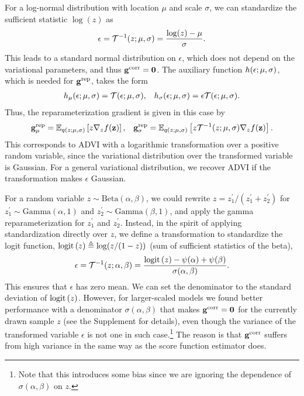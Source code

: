 For a log-normal distribution with location $\mu$ and scale $\sigma$, we can standardize the sufficient statistic $\log(z)$ as
\begin{equation}
	\epsilon=\mathcal{T}^{-1}(z;\mu,\sigma)=\frac{\log(z)-\mu}{\sigma}.\nonumber
\end{equation}
This leads to a standard normal distribution on $\epsilon$, which does not depend on the variational parameters, and thus $\mathbf{g}^{\textrm{corr}}=\mathbf{0}$. The auxiliary function $h(\epsilon;\mu,\sigma)$, which is needed for $\mathbf{g}^{\textrm{rep}}$, takes the form
\begin{align}
    & h_{\mu}(\epsilon;\mu,\sigma) = \mathcal{T}(\epsilon;\mu,\sigma),
    & h_{\sigma}(\epsilon;\mu,\sigma) = \epsilon\mathcal{T}(\epsilon;\mu,\sigma). \nonumber
\end{align}
Thus, the reparameterization gradient is given in this case by
\begin{align}
    & \mathbf{g}^{\textrm{rep}}_{\mu} = \mathbb{E}_{q(z;\mu,\sigma)}\left[z\nabla_{z}f(\mathbf{z})\right],
    & \mathbf{g}^{\textrm{rep}}_{\sigma} = \mathbb{E}_{q(z;\mu,\sigma)}\left[z\mathcal{T}^{-1}(z;\mu,\sigma)\nabla_{z}f(\mathbf{z})\right]. \nonumber
\end{align}
This corresponds to \gls{ADVI} \citep{Kucukelbir2016} with a logarithmic transformation over a positive random variable, since the variational distribution over the transformed variable is Gaussian. For a general variational distribution, we recover \gls{ADVI} if the transformation makes $\epsilon$ Gaussian.

For a random variable $z\sim\textrm{Beta}(\alpha,\beta)$, we could rewrite $z=z_1^\prime/(z_1^\prime+z_2^\prime)$ for $z_1^\prime\sim\textrm{Gamma}(\alpha,1)$ and $z_2^\prime\sim\textrm{Gamma}(\beta,1)$, and apply the gamma reparameterization for $z_1^\prime$ and $z_2^\prime$. Instead, in the spirit of applying standardization directly over $z$, we define a transformation to standardize the logit function, $\textrm{logit}\left(z\right)\triangleq\log(z/(1-z))$ (sum of sufficient statistics of the beta),
\begin{equation}\nonumber
	\epsilon=\mathcal{T}^{-1}(z;\alpha,\beta)=\frac{\textrm{logit}\left(z\right)-\psi(\alpha)+\psi(\beta)}{\sigma(\alpha,\beta)}.
\end{equation}
This ensures that $\epsilon$ has zero mean. We can set the denominator to the standard deviation of $\textrm{logit}\left(z\right)$. However, for larger-scaled models we found better performance with a denominator $\sigma(\alpha,\beta)$ that makes $\mathbf{g}^{\textrm{corr}}=\mathbf{0}$ for the currently drawn sample $z$ (see the Supplement for details), even though the variance of the transformed variable $\epsilon$ is not one in such case.\footnote{Note that this introduces some bias since we are ignoring the dependence of $\sigma(\alpha,\beta)$ on $z$.} The reason is that $\mathbf{g}^{\textrm{corr}}$ suffers from high variance in the same way as the score function estimator does.

